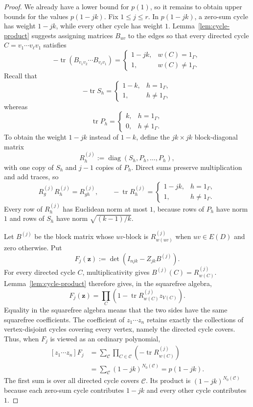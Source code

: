 \documentclass[11pt]{amsart}
\theoremstyle{remark}
\newcommand{\tr}{\operatorname{tr}}
\newcommand{\diag}{\operatorname{diag}}
\begin{document}
\begin{proof}
We already have a lower bound for $p(1)$, so it remains to obtain upper
bounds for the values $p(1-jk)$.  Fix $1\le j\le r$.  In $p(1-jk)$,
a zero-sum cycle has weight $1-jk$, while every other cycle has weight
$1$.  Lemma~\ref{lem:cycle-product} suggests assigning matrices
$B_{uv}$ to the edges so that every directed cycle
$C=v_1\cdots v_\ell v_1$ satisfies
\[
  -\tr(B_{v_1v_2}\cdots B_{v_\ell v_1})
  =
  \begin{cases}
    1-jk,&w(C)=1_\Gamma,\\
    1,&w(C)\ne1_\Gamma.
  \end{cases}
\]
Recall that
\[
  -\tr S_h=
  \begin{cases}
    1-k,&h=1_\Gamma,\\
    1,&h\ne1_\Gamma,
  \end{cases}
\]
whereas
\[
  \tr P_h=
  \begin{cases}
    k,&h=1_\Gamma,\\
    0,&h\ne1_\Gamma.
  \end{cases}
\]
To obtain the weight $1-jk$ instead of $1-k$, define the $jk\times jk$
block-diagonal matrix
\[
  R_h^{(j)}:=\diag(S_h,P_h,\ldots,P_h),
\]
with one copy of $S_h$ and $j-1$ copies of $P_h$.  Direct sums preserve
multiplication and add traces, so
\[
  R_g^{(j)}R_h^{(j)}=R_{gh}^{(j)},
  \qquad
  -\tr R_h^{(j)}
  =
  \begin{cases}
    1-jk,&h=1_\Gamma,\\
    1,&h\ne1_\Gamma.
  \end{cases}
\]
Every row of $R_h^{(j)}$ has Euclidean norm at most $1$, because rows
of $P_h$ have norm $1$ and rows of $S_h$ have norm
$\sqrt{(k-1)/k}$.

Let $B^{(j)}$ be the block matrix whose $uv$-block is
$R_{w(uv)}^{(j)}$ when $uv\in E(D)$ and zero otherwise.  Put
\[
  F_j(\mathbf z):=\det(I_{njk}-Z_{jk}B^{(j)}).
\]
For every directed cycle $C$, multiplicativity gives
$B^{(j)}(C)=R_{w(C)}^{(j)}$.  Lemma~\ref{lem:cycle-product}
therefore gives, in the squarefree algebra,
\[
  F_j(\mathbf z)
  =\prod_C\left(1-\tr R_{w(C)}^{(j)}z_{V(C)}\right).
\]
Equality in the squarefree algebra means that the two sides have the
same squarefree coefficients.  The coefficient of
$z_1\cdots z_n$ retains exactly the collections of vertex-disjoint
cycles covering every vertex, namely the directed cycle covers.
Thus, when $F_j$ is viewed as an ordinary polynomial,
\[
\begin{aligned}
  [z_1\cdots z_n]F_j
  &=
  \sum_{\mathcal C}
  \prod_{C\in\mathcal C}
  \left(-\tr R_{w(C)}^{(j)}\right)\\
  &=
  \sum_{\mathcal C}(1-jk)^{N_0(\mathcal C)}
  =p(1-jk).
\end{aligned}
\]
The first sum is over all directed cycle covers $\mathcal C$.  Its
product is $(1-jk)^{N_0(\mathcal C)}$ because each zero-sum cycle
contributes $1-jk$ and every other cycle contributes $1$.


\end{proof}
\end{document}
